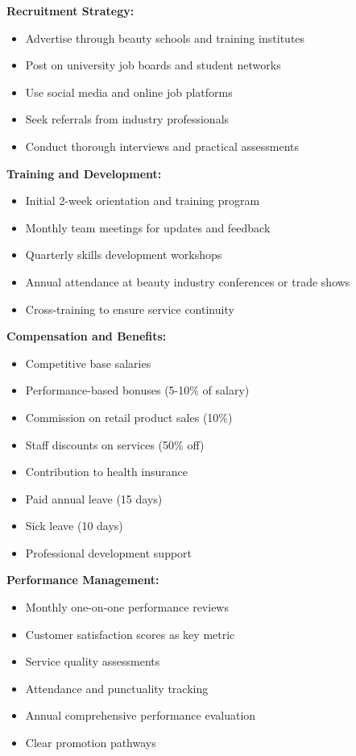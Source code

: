 \documentclass[a4paper,12pt]{article}
\begin{document}
\textbf{Recruitment Strategy:}
\begin{itemize}[leftmargin=2em]
    \item Advertise through beauty schools and training institutes
    \item Post on university job boards and student networks
    \item Use social media and online job platforms
    \item Seek referrals from industry professionals
    \item Conduct thorough interviews and practical assessments
\end{itemize}

\textbf{Training and Development:}
\begin{itemize}[leftmargin=2em]
    \item Initial 2-week orientation and training program
    \item Monthly team meetings for updates and feedback
    \item Quarterly skills development workshops
    \item Annual attendance at beauty industry conferences or trade shows
    \item Cross-training to ensure service continuity
\end{itemize}

\textbf{Compensation and Benefits:}
\begin{itemize}[leftmargin=2em]
    \item Competitive base salaries
    \item Performance-based bonuses (5-10\% of salary)
    \item Commission on retail product sales (10\%)
    \item Staff discounts on services (50\% off)
    \item Contribution to health insurance
    \item Paid annual leave (15 days)
    \item Sick leave (10 days)
    \item Professional development support
\end{itemize}

\textbf{Performance Management:}
\begin{itemize}[leftmargin=2em]
    \item Monthly one-on-one performance reviews
    \item Customer satisfaction scores as key metric
    \item Service quality assessments
    \item Attendance and punctuality tracking
    \item Annual comprehensive performance evaluation
    \item Clear promotion pathways
\end{itemize}
\end{document}
